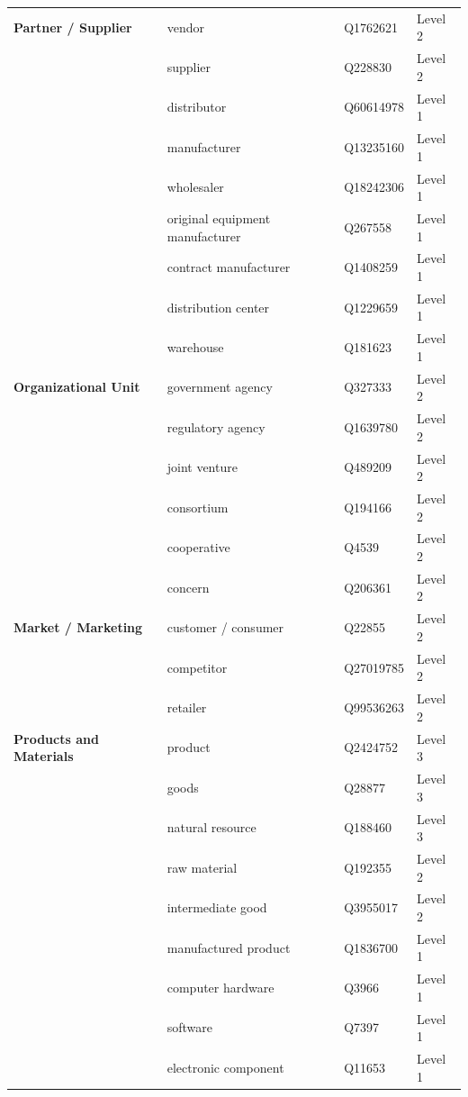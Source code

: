 \begin{appendices}
\begin{longtable}{l|p{5cm}|p{3cm}|l}
\textbf{Partner / Supplier}
& vendor                          & Q1762621  & Level 2 \\
& supplier                        & Q228830   & Level 2 \\
& distributor                     & Q60614978 & Level 1 \\
& manufacturer                    & Q13235160 & Level 1 \\
& wholesaler                      & Q18242306 & Level 1 \\
& original equipment manufacturer & Q267558   & Level 1 \\
& contract manufacturer           & Q1408259  & Level 1 \\
& distribution center             & Q1229659  & Level 1 \\
& warehouse                       & Q181623   & Level 1 \\
\midrule

\textbf{Organizational Unit}
& government agency & Q327333  & Level 2 \\
& regulatory agency & Q1639780 & Level 2 \\
& joint venture     & Q489209  & Level 2 \\
& consortium        & Q194166  & Level 2 \\
& cooperative       & Q4539    & Level 2 \\
& concern           & Q206361  & Level 2 \\
\midrule

\textbf{Market / Marketing}
& customer / consumer & Q22855    & Level 2 \\
& competitor          & Q27019785 & Level 2 \\
& retailer            & Q99536263 & Level 2 \\
\midrule

\textbf{Products and Materials}
& product              & Q2424752 & Level 3 \\
& goods                & Q28877   & Level 3 \\
& natural resource     & Q188460  & Level 3 \\
& raw material         & Q192355  & Level 2 \\
& intermediate good    & Q3955017 & Level 2 \\
& manufactured product & Q1836700 & Level 1 \\
& computer hardware    & Q3966    & Level 1 \\
& software             & Q7397    & Level 1 \\
& electronic component & Q11653   & Level 1 \\


\end{longtable}
\end{appendices}
